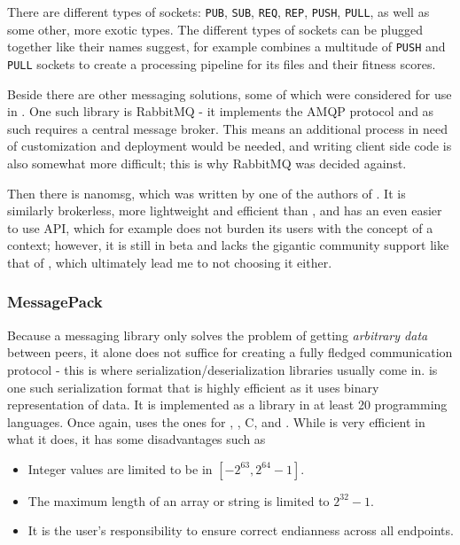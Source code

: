 There are different types of sockets: \texttt{PUB}, \texttt{SUB}, \texttt{REQ}, \texttt{REP}, \texttt{PUSH}, 
\texttt{PULL}, as well as some other, more exotic types. The different types of sockets can be plugged together
like their names suggest, for example \xmlmate combines a multitude of \texttt{PUSH} and \texttt{PULL} sockets
to create a processing pipeline for its \xml files and their fitness scores.

Beside \zmq there are other messaging solutions, some of which were considered for use in \xmlmate. One such
library is {\small RabbitMQ}\cite{rabbitmq} - it implements the AMQP protocol and as such requires a central
message broker. This means an additional process in need of customization and deployment would be needed, and
writing client side code is also somewhat more difficult; this is why {\small RabbitMQ} was decided against.

Then there is {\small nanomsg}\cite{nanomsg}, which was written by one of the authors of \zmq. 
It is similarly brokerless, more lightweight and efficient than \zmq, and has an even easier to use API, which
for example does not burden its users with the concept of a context; however, it is still in beta and lacks
the gigantic community support like that of \zmq, which ultimately lead me to not choosing it either.
\tocless\subsubsection{MessagePack}
\label{sec:msgpack}
Because a messaging library only solves the problem of getting \emph{arbitrary data} between peers, it 
alone does not suffice for creating a fully fledged communication protocol - this is where
serialization/deserialization libraries usually come in. \msgpack{}\cite{msgpack} is one such serialization
format that is highly efficient as it uses binary representation of data. It is implemented as a library in at
least 20 programming languages. Once again, \xmlmate uses the ones for \java, \python, {\small C}, and \cpp.
While \msgpack is very efficient in what it does, it has some disadvantages such as 
\begin{itemize}
  \item Integer values are limited to be in $[-2^{63}, 2^{64}-1]$.
  \item The maximum length of an array or string is limited to $2^{32}-1$.
  \item It is the user's responsibility to ensure correct endianness across all endpoints.
\end{itemize}

